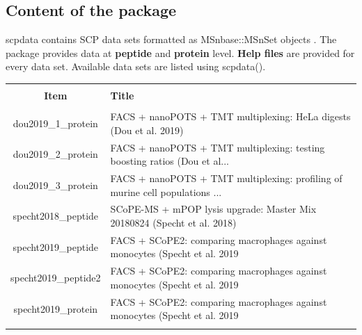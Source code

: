 \documentclass{article}
\newcommand{\hcode}[2][lgray]{{\ttfamily\color{vdgray}\colorbox{#1}{#2}}}
\begin{document}
\begin{multicols}{2}
\noindent
\begin{minipage}[t]{\linewidth}
  \vspace{0.55cm}
  \section*{\huge Content of the package}
  \large
  \hcode{scpdata} contains SCP data sets formatted as \hcode{MSnbase::MSnSet} objects \cite{Gatto2012-tb}. The package provides data at \textbf{peptide} and \textbf{protein} level. \textbf{Help files} are provided for every data set. Available data sets are listed using \hcode{scpdata()}.
  
  \footnotesize
  \begin{tabular}{@{\extracolsep{5pt}} cl} 
    \\[-1.8ex]\hline 
    \hline \\[-1.8ex] 
    \textbf{Item} & \textbf{Title} \\ 
    \hline \\[-1.8ex] 
    dou2019\_1\_protein & FACS + nanoPOTS + TMT multiplexing: HeLa digests (Dou et al. 2019) \\ 
    dou2019\_2\_protein & FACS + nanoPOTS + TMT multiplexing: testing boosting ratios (Dou et al... \\ 
    dou2019\_3\_protein & FACS + nanoPOTS + TMT multiplexing: profiling of murine cell populations ... \\
    specht2018\_peptide & SCoPE-MS + mPOP lysis upgrade: Master Mix 20180824 (Specht et al. 2018) \\ 
    specht2019\_peptide & FACS + SCoPE2: comparing macrophages against monocytes (Specht et al. 2019 \\ 
    specht2019\_peptide2 & FACS + SCoPE2: comparing macrophages against monocytes (Specht et al. 2019 \\ 
    specht2019\_protein & FACS + SCoPE2: comparing macrophages against monocytes (Specht et al. 2019 \\ 
    \hline \\[-1.8ex] 
  \end{tabular} 
\end{minipage}
  
\noindent
\begin{minipage}[t]{\linewidth}
  \vspace{0.5cm}

\end{minipage}
\end{multicols}
\end{document}
